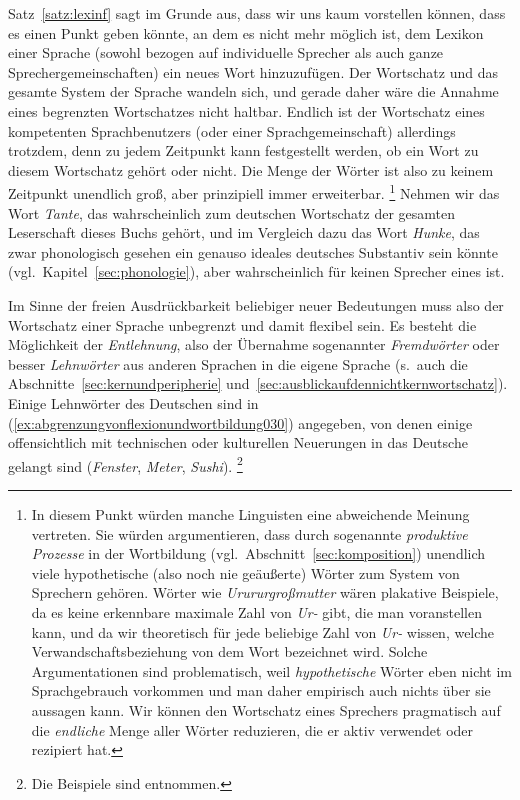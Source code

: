 Satz~\ref{satz:lexinf} sagt im Grunde aus, dass wir uns kaum vorstellen können, dass es einen Punkt geben könnte, an dem es nicht mehr möglich ist, dem Lexikon einer Sprache (sowohl bezogen auf individuelle Sprecher als auch ganze Sprechergemeinschaften) ein neues Wort hinzuzufügen.
Der Wortschatz und das gesamte System der Sprache wandeln sich, und gerade daher wäre die Annahme eines begrenzten Wortschatzes nicht haltbar.
Endlich ist der Wortschatz eines kompetenten Sprachbenutzers (oder einer Sprachgemeinschaft) allerdings trotzdem, denn zu jedem Zeitpunkt kann festgestellt werden, ob ein Wort zu diesem Wortschatz gehört oder nicht.
Die Menge der Wörter ist also zu keinem Zeitpunkt unendlich groß, aber prinzipiell immer erweiterbar.%
\footnote{In diesem Punkt würden manche Linguisten eine abweichende Meinung vertreten.
Sie würden argumentieren, dass durch sogenannte \textit{produktive Prozesse} in der Wortbildung (vgl.\ Abschnitt~\ref{sec:komposition}) unendlich viele hypothetische (also noch nie geäußerte) Wörter zum System von Sprechern gehören.
Wörter wie \textit{Urururgroßmutter} wären plakative Beispiele, da es keine erkennbare maximale Zahl von \textit{Ur-} gibt, die man voranstellen kann, und da wir theoretisch für jede beliebige Zahl von \textit{Ur-} wissen, welche Verwandschaftsbeziehung von dem Wort bezeichnet wird.
Solche Argumentationen sind problematisch, weil \textit{hypothetische} Wörter eben nicht im Sprachgebrauch vorkommen und man daher empirisch auch nichts über sie aussagen kann.
Wir können den Wortschatz eines Sprechers pragmatisch auf die \textit{endliche} Menge aller Wörter reduzieren, die er aktiv verwendet oder rezipiert hat.}
Nehmen wir das Wort \textit{Tante}, das wahrscheinlich zum deutschen Wortschatz der gesamten Leserschaft dieses Buchs gehört, und im Vergleich dazu das Wort \textit{Hunke}, das zwar phonologisch gesehen ein genauso ideales deutsches Substantiv sein könnte (vgl.\ Kapitel~\ref{sec:phonologie}), aber wahrscheinlich für keinen Sprecher eines ist.

Im Sinne der freien Ausdrückbarkeit beliebiger neuer Bedeutungen muss also der Wortschatz einer Sprache unbegrenzt und damit flexibel sein.
Es besteht die Möglichkeit der \textit{Entlehnung}, also der Übernahme sogenannter \textit{Fremdwörter} oder besser \textit{Lehnwörter} aus anderen Sprachen in die eigene Sprache (s.\ auch die Abschnitte~\ref{sec:kernundperipherie} und~\ref{sec:ausblickaufdennichtkernwortschatz}).
Einige Lehnwörter des Deutschen sind in (\ref{ex:abgrenzungvonflexionundwortbildung030}) angegeben, von denen einige offensichtlich mit technischen oder kulturellen Neuerungen in das Deutsche gelangt sind (\textit{Fenster}, \textit{Meter}, \textit{Sushi}).%
\footnote{Die Beispiele sind \citet{Kluge2002} entnommen.}

